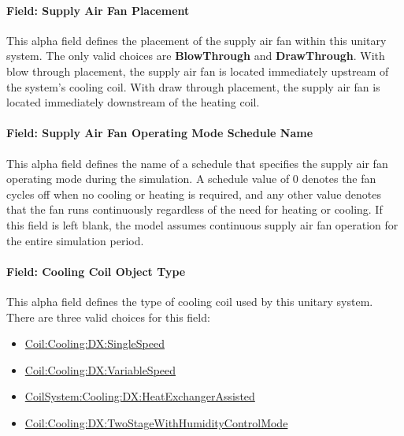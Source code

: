 \paragraph{Field: Supply Air Fan Placement}\label{field-supply-air-fan-placement-1}

This alpha field defines the placement of the supply air fan within this unitary system. The only valid choices are \textbf{BlowThrough} and \textbf{DrawThrough}. With blow through placement, the supply air fan is located immediately upstream of the system's cooling coil. With draw through placement, the supply air fan is located immediately downstream of the heating coil.

\paragraph{Field: Supply Air Fan Operating Mode Schedule Name}\label{field-supply-air-fan-operating-mode-schedule-name-3}

This alpha field defines the name of a schedule that specifies the supply air fan operating mode during the simulation. A schedule value of 0 denotes the fan cycles off when no cooling or heating is required, and any other value denotes that the fan runs continuously regardless of the need for heating or cooling. If this field is left blank, the model assumes continuous supply air fan operation for the entire simulation period.

\paragraph{Field: Cooling Coil Object Type}\label{field-cooling-coil-object-type-6}

This alpha field defines the type of cooling coil used by this unitary system. There are three valid choices for this field:

\begin{itemize}
\item
  \hyperref[coilcoolingdxsinglespeed]{Coil:Cooling:DX:SingleSpeed}
\item
  \hyperref[coilcoolingdxvariablespeed]{Coil:Cooling:DX:VariableSpeed}
\item
  \hyperref[coilsystemcoolingdxheatexchangerassisted]{CoilSystem:Cooling:DX:HeatExchangerAssisted}
\item
  \hyperref[coilcoolingdxtwostagewithhumiditycontrolmode]{Coil:Cooling:DX:TwoStageWithHumidityControlMode}
\end{itemize}

